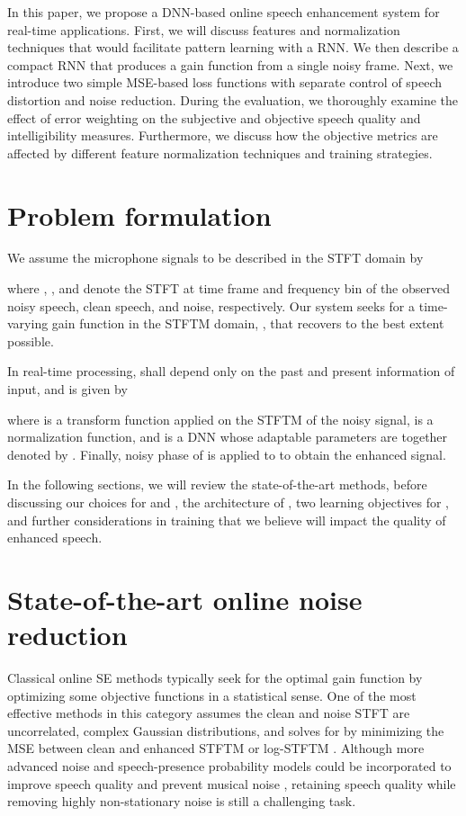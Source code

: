 \documentclass{article}
\begin{document}
In this paper, we propose a DNN-based online speech enhancement system for real-time applications. First, we will discuss features and normalization techniques that would facilitate pattern learning with a \ac{RNN}. We then describe a compact \ac{RNN} that produces a gain function from a single noisy frame. Next, we introduce two simple \ac{MSE}-based loss functions with separate control of speech distortion and noise reduction. During the evaluation, we thoroughly examine the effect of error weighting on the subjective and objective speech quality and intelligibility measures. Furthermore, we discuss how the objective metrics are affected by different feature normalization techniques and training strategies.
\section{Problem formulation}
\vspace{-1mm}
\label{sec:problem}
We assume the microphone signals to be described in the \ac{STFT} domain by

where , , and  denote the \ac{STFT} at time frame  and frequency bin  of the observed noisy speech, clean speech, and noise, respectively. Our system seeks for a time-varying gain function in the \ac{STFTM} domain, , that recovers  to the best extent possible.

In real-time processing,  shall depend only on the past and present information of input, and is given by

where  is a transform function applied on the \ac{STFTM} of the noisy signal,  is a normalization function, and  is a DNN whose adaptable parameters are together denoted by . Finally, noisy phase of  is applied to  to obtain the enhanced signal.

In the following sections, we will review the state-of-the-art methods, before discussing our choices for  and , the architecture of , two learning objectives for , and further considerations in training that we believe will impact the quality of enhanced speech.

\section{State-of-the-art online noise reduction}
\label{sec:sota}

Classical online SE methods typically seek for the optimal gain function by optimizing some objective functions in a statistical sense. One of the most effective methods in this category assumes the clean and noise \ac{STFT} are uncorrelated, complex Gaussian distributions, and solves for  by minimizing the \ac{MSE} between clean and enhanced \ac{STFTM} \cite{ephraim1984speech} or log-\ac{STFTM} \cite{ephraim1985speech}. Although more advanced noise and speech-presence probability models could be incorporated to improve speech quality and prevent musical noise \cite{cohen2002noise, cohen2001speech}, retaining speech quality while removing highly non-stationary noise is still a challenging task.
\end{document}
